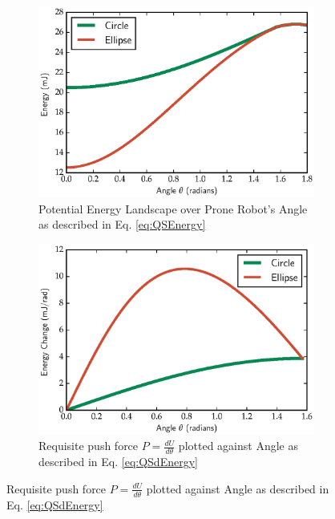 \documentclass[letterpaper]{report}
\begin{document}
\begin{figure}[ht]
  \centering
  \begin{subfigure}[t]{0.45\textwidth}
    \centering
    \includegraphics[width=1.0\textwidth]{EnergyLandscape.eps}
    \caption{\label{fig:QSEnergy}Potential Energy Landscape over Prone Robot's Angle as described in Eq. \ref{eq:QSEnergy}}
  \end{subfigure}
  \hfill
  \begin{subfigure}[t]{0.45\textwidth}
    \centering
    \includegraphics[width=1.0\textwidth]{dEnergyLandscape.eps}
    \caption{\label{fig:QSdEnergy}Requisite push force $P = \frac{d U}{d \theta}$ plotted against Angle as described in Eq. \ref{eq:QSdEnergy}}
  \end{subfigure}
\end{figure}
\end{document}
